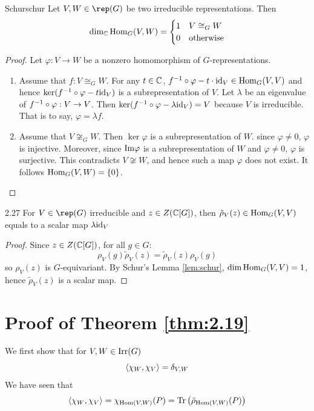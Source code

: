 \documentclass[twoside = false,	%
		headsepline,		%
		parskip = true,
		]{scrbook}						%
\begin{document}
    \begin{lemma}{Schur}{schur}
        Let $V,W \in \rep(G)$ be two irreducible representations. Then
        $$\dim_\mathbb C\mathrm{Hom}_G(V,W)=\begin{cases}
            1 & V\cong_G W\\
            0 & \text{otherwise}
        \end{cases}$$
    \end{lemma}
    \begin{proof}
        Let $\varphi: V \to W$  be a nonzero homomorphism of $G$-representations.
        \begin{enumerate}
            \item Assume that $f:V\cong_G W$. For any $t\in\mathbb C$, $f^{-1}\circ\varphi-t\cdot\mathrm{id}_V\in\mathrm{Hom}_G(V,V)$ and hence $\ker(f^{-1}\circ\varphi-t\mathrm{id}_V)$ is a subrepresentation of $V$. Let $\lambda$ be an eigenvalue of $f^{-1}\circ\varphi:V\to V$. Then $\ker(f^{-1}\circ\varphi-\lambda\mathrm{id}_V) = V$ because $V$ is irreducible. That is to say, $\varphi=\lambda f$.
            \item Assume that $V\not\cong_G W$. Then $\ker\varphi$ is a subrepresentation of $W$. since $\varphi\neq 0$, $\varphi$ is injective. Moreover, since $\mathrm{Im}\varphi$ is a subrepresentation of $W$ and $\varphi\neq 0$, $\varphi$ is surjective. This contradicts $V\not\cong W$, and hence such a map $\varphi$ does not exist. It follows $\mathrm{Hom}_G(V,W)=\left\{ 0\right\}$.
        \end{enumerate}
    \end{proof}
    \begin{corollary}{}{2.27}
        For $V\in\rep(G)$ irreducible and $z\in Z(\mathbb C[G])$, then $\tilde\rho_V(z) \in \mathrm{Hom}_G(V,V)$ equals to a scalar map $\lambda\mathrm{id}_V$
    \end{corollary}

    \begin{proof}
        Since $z \in Z(\mathbb C[G])$, for all $g \in G:$
        \begin{equation*}
            \rho_V(g) \tilde \rho_V(z) = \tilde \rho_V(z) \rho_V(g)
        \end{equation*}
        so $\rho_V(z)$ is $G$-equivariant. By Schur's Lemma \ref{lem:schur}, $\dim \mathrm{Hom}_G(V,V) = 1$, hence $\tilde \rho_V(z)$ is a scalar map.
    \end{proof}
    
\section{Proof of Theorem \ref{thm:2.19}}
    We first show that for $V,W\in\mathrm{Irr}(G)$ $$\left\langle \chi_W,\chi_V\right\rangle=\delta_{V,W}$$
    We have seen that $$\left\langle \chi_W,\chi_V\right\rangle=\chi_{\mathrm{Hom}(V,W)}(P)=\mathrm{Tr}\left( \tilde\rho_{\mathrm{Hom}(V,W)}(P)\right)$$
\end{document}
